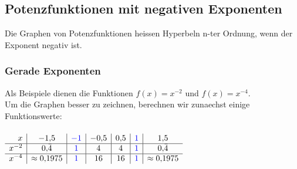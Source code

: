\begin{multicols}{2}
    \subsection{Potenzfunktionen mit negativen Exponenten}
    \vspace{-4mm}
    Die Graphen von Potenzfunktionen heissen Hyperbeln n-ter Ordnung, wenn der Exponent negativ ist.
    \subsubsection{Gerade Exponenten}
    \vspace{-4mm}
    Als Beispiele dienen die Funktionen $f(x) = x^{-2}$ und $f(x) = x^{-4}$. \\
    Um die Graphen besser zu zeichnen, berechnen wir zunaechst einige Funktionswerte: \\~\\
    $\begin{array}{r|c|c|c|c|c|c} x & -1{,}5 & {\color{blue}-1} & -0{,}5 & 0{,}5 & {\color{blue}1} & 1{,}5 \\ \hline x^{-2} & 0{,}\bar{4} & {\color{blue}1} & 4 & 4 & {\color{blue}1} & 0{,}\bar{4} \\ \hline x^{-4} & \approx 0{,}1975 & {\color{blue}1} & 16 & 16 & {\color{blue}1} & \approx 0{,}1975 \end{array}$ \\~\\

\end{multicols}
